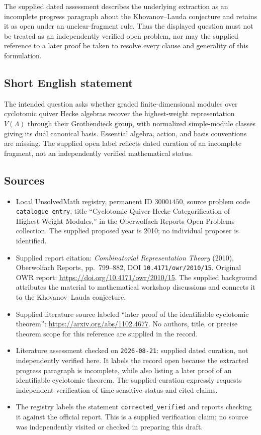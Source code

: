 \documentclass[11pt]{article}
\begin{document}
The supplied dated assessment describes the underlying extraction as an incomplete progress paragraph about the Khovanov--Lauda conjecture and retains it as open under an unclear-fragment rule. Thus the displayed question must not be treated as an independently verified open problem, nor may the supplied reference to a later proof be taken to resolve every clause and generality of this formulation.
\subsection{Short English statement}
The intended question asks whether graded finite-dimensional modules over cyclotomic quiver Hecke algebras recover the highest-weight representation \(V(\Lambda)\) through their Grothendieck group, with normalized simple-module classes giving its dual canonical basis. Essential algebra, action, and basis conventions are missing. The supplied open label reflects dated curation of an incomplete fragment, not an independently verified mathematical status.
\subsection{Sources}
\begin{itemize}
\item Local UnsolvedMath registry, permanent ID \(30001450\), source problem code \texttt{catalogue entry}, title ``Cyclotomic Quiver-Hecke Categorification of Highest-Weight Modules,'' in the Oberwolfach Reports Open Problems collection. The supplied proposed year is 2010; no individual proposer is identified.
\item Supplied report citation: \emph{Combinatorial Representation Theory} (2010), Oberwolfach Reports, pp.~799--882, DOI \texttt{10.4171/owr/2010/15}. Original OWR report: \url{https://doi.org/10.4171/owr/2010/15}. The supplied background attributes the material to mathematical workshop discussions and connects it to the Khovanov--Lauda conjecture.
\item Supplied literature source labeled ``later proof of the identifiable cyclotomic theorem'': \url{https://arxiv.org/abs/1102.4677}. No authors, title, or precise theorem scope for this reference are supplied in the record.
\item Literature assessment checked on \texttt{2026-08-21}: supplied dated curation, not independently verified here. It labels the record open because the extracted progress paragraph is incomplete, while also listing a later proof of an identifiable cyclotomic theorem. The supplied curation expressly requests independent verification of time-sensitive status and cited claims.
\item The registry labels the statement \texttt{corrected\_verified} and reports checking it against the official report. This is a supplied verification claim; no source was independently visited or checked in preparing this draft.
\end{itemize}
\end{document}
